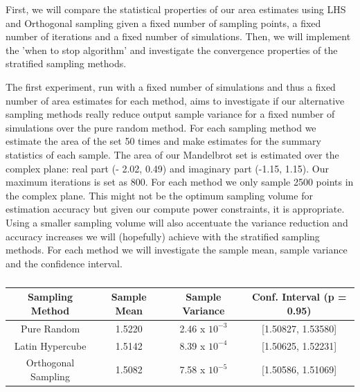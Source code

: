 \documentclass{article}
\begin{document}
    First, we will compare the statistical properties of our area estimates using LHS and Orthogonal sampling given a fixed number of sampling points, a fixed number of iterations and a fixed number of simulations. Then, we will implement the 'when to stop algorithm' and investigate the convergence properties of the stratified sampling methods.

    The first experiment, run with a fixed number of simulations and thus a fixed number of area estimates for each method, aims to investigate if our alternative sampling methods really reduce output sample variance for a fixed number of simulations over the pure random method. For each sampling method we estimate the area of the set 50 times and make estimates for the summary statistics of each sample. The area of our Mandelbrot set is estimated over the complex plane: real part (- 2.02, 0.49) and imaginary part (-1.15, 1.15). Our maximum iterations is set as 800. For each method we only sample 2500 points in the complex plane. This might not be the optimum sampling volume for estimation accuracy but given our compute power constraints, it is appropriate. Using a smaller sampling volume will also accentuate the variance reduction and accuracy increases we will (hopefully) achieve with the stratified sampling methods. For each method we will investigate the sample mean, sample variance and the confidence interval.

    \begin{table}[h!]
        \centering
        \begin{tabular}{|c | c | c | c|}
            \hline
            Sampling Method & Sample Mean & Sample Variance & Conf. Interval (p = 0.95) \\
            \hline\hline
            Pure Random & 1.5220 & 2.46 x $10^{-3}$ & [1.50827, 1.53580] \\
            Latin Hypercube & 1.5142 & 8.39 x $10^{-4}$ & [1.50625, 1.52231] \\
            Orthogonal Sampling & 1.5082 & 7.58 x $10^{-5}$ & [1.50586, 1.51069] \\
            \hline
        \end{tabular}
        \caption{}
        \label{Table:q3e1}
    \end{table}
\end{document}

